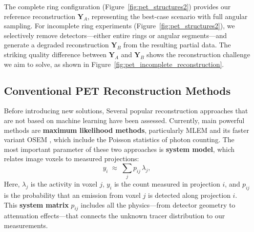 \documentclass[
reprint,
superscriptaddress,
nofootinbib,
amsmath,amssymb,
aps,
prd,
]{revtex4-2}
\begin{document}
The complete ring configuration (Figure~\ref{fig:pet_structures2}) provides our reference reconstruction $\mathbf{Y}_A$, representing the best-case scenario with full angular sampling. For incomplete ring experiments (Figure~\ref{fig:pet_structures2}), we selectively remove detectors—either entire rings or angular segments—and generate a degraded reconstruction $\mathbf{Y}_B$ from the resulting partial data. The striking quality difference between $\mathbf{Y}_A$ and $\mathbf{Y}_B$ shows the reconstruction challenge we aim to solve, as shown in Figure~\ref{fig:pet_incomplete_reconstruction}.

\subsection{Conventional PET Reconstruction Methods}

Before introducing new solutions, Several popular reconstruction approaches that are not based on machine learning have been assessed.
Currently, main powerful methods are \textbf{maximum likelihood methods}, particularly MLEM and its faster variant OSEM \cite{363108}, which include the Poisson statistics of photon counting. The most important parameter of these two approaches is \textbf{system model}, which relates image voxels to measured projections:
\begin{equation}
    y_i \;\approx\; \sum_{j} p_{ij}\,\lambda_j,
\end{equation}
Here, $\lambda_j$ is the activity in voxel $j$, $y_i$ is the count measured in projection $i$, and $p_{ij}$ is the probability that an emission from voxel $j$ is detected along projection $i$. This \textbf{system matrix} $p_{ij}$ includes all the physics—from detector geometry to attenuation effects—that connects the unknown tracer distribution to our measurements.
\end{document}
